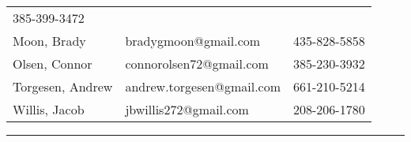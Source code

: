 \documentclass[]{auvsi_doc}
\begin{document}
\begin{longtable}[]{@{}lll@{}}
\begin{minipage}[t]{0.30\columnwidth}
{385-399-3472}\strut
\end{minipage}\tabularnewline
\begin{minipage}[t]{0.30\columnwidth}\raggedright\strut
{Moon, Brady}\strut
\end{minipage} & \begin{minipage}[t]{0.30\columnwidth}\raggedright\strut
{bradygmoon@gmail.com}\strut
\end{minipage} & \begin{minipage}[t]{0.30\columnwidth}\raggedright\strut
{435-828-5858}\strut
\end{minipage}\tabularnewline
\begin{minipage}[t]{0.30\columnwidth}\raggedright\strut
{Olsen, Connor}\strut
\end{minipage} & \begin{minipage}[t]{0.30\columnwidth}\raggedright\strut
{connorolsen72@gmail.com}\strut
\end{minipage} & \begin{minipage}[t]{0.30\columnwidth}\raggedright\strut
{385-230-3932}\strut
\end{minipage}\tabularnewline
\begin{minipage}[t]{0.30\columnwidth}\raggedright\strut
{Torgesen, Andrew}\strut
\end{minipage} & \begin{minipage}[t]{0.30\columnwidth}\raggedright\strut
{andrew.torgesen@gmail.com}\strut
\end{minipage} & \begin{minipage}[t]{0.30\columnwidth}\raggedright\strut
{661-210-5214}\strut
\end{minipage}\tabularnewline
\begin{minipage}[t]{0.30\columnwidth}\raggedright\strut
{Willis, Jacob}\strut
\end{minipage} & \begin{minipage}[t]{0.30\columnwidth}\raggedright\strut
{jbwillis272@gmail.com}\strut
\end{minipage} & \begin{minipage}[t]{0.30\columnwidth}\raggedright\strut
{208-206-1780}\strut
\end{minipage}\tabularnewline
\bottomrule
\end{longtable}

{}

\begin{center}\rule{0.5\linewidth}{\linethickness}\end{center}
\end{document}
